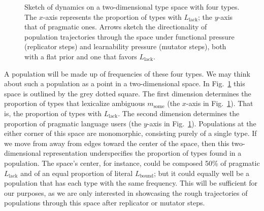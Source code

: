 \documentclass[a4paper, 11pt]{article}
\theoremstyle{Satz}
\newcommand{\mylang}[1]{\ensuremath{L_{\text{#1}}}\xspace} %
\newcommand{\messg}{\ensuremath{m}\xspace}		%
\newcommand{\mymessg}[1]{\ensuremath{\messg_{\text{#1}}}\xspace} %
\newcommand{\msome}{\mymessg{some}}
\newcommand{\Lbound}{\mylang{bound}}
\newcommand{\Llack}{\mylang{lack}}
\begin{document}
\begin{figure}
\begin{tikzpicture}
    \end{tikzpicture}
\caption{Sketch of dynamics on a two-dimensional type space with four types. The $x$-axis represents the proportion of types with $\Llack$; the $y$-axis that of pragmatic ones. Arrows sketch the directionality of population trajectories through the space under functional pressure (replicator steps) and learnability pressure (mutator steps), both with a flat prior and one that favors $\Llack$.}
\label{fig:sketch}
\end{figure}


A population will be made up of frequencies of these four types. We may think about such a population as a point in a two-dimensional space. In Fig.~\ref{fig:sketch} this space is outlined by the grey dotted square. The first dimension determines the proportion of types that lexicalize ambiguous $\msome$ (the $x$-axis in Fig.~\ref{fig:sketch}). That is, the proportion of types with $\Llack$. The second dimension determines the proportion of pragmatic language users (the $y$-axis in Fig.~\ref{fig:sketch}). Populations at the either corner of this space are monomorphic, consisting purely of a single type. If we move from away from edges toward the center of the space, then this two-dimensional representation underspecifies the proportion of types found in a population. The space's center, for instance, could be composed 50\% of pragmatic $\Llack$ and of an equal proportion of literal $\Lbound$; but it could equally well be a population that has each type with the same frequency. This will be sufficient for our purposes, as we are only interested in showcasing the rough trajectories of populations through this space after replicator or mutator steps. 
\end{document}
